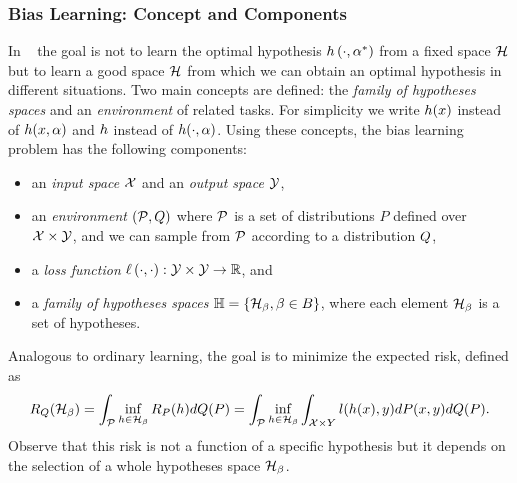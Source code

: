 

\subsubsection*{Bias Learning: Concept and Components}
In ~\cite{baxter2000model} the goal is not to learn the optimal hypothesis $h\left(\cdot, \alpha^*\right)$ from a fixed space $\mathcal{H}$ but to learn a good space $\mathcal{H}$ from which we can obtain an optimal hypothesis in different situations.
%
Two main concepts are defined: the \emph{family of hypotheses spaces} and an \emph{environment} of related tasks. 
For simplicity we write $h(x)$ instead of $h(x, \alpha)$ and $h$ instead of $h(\cdot, \alpha)$.
Using these concepts, the bias learning problem has the following components:
\begin{itemize}
    \item an \emph{input space} $\mathcal{X}$ and an \emph{output space} $\mathcal{Y}$,
    \item an \emph{environment} $(\mathcal{P}, Q)$ where $\mathcal{P}$ is a set of distributions $P$ defined over $\mathcal{X} \times \mathcal{Y}$, and we can sample from $\mathcal{P}$ according to a distribution $Q$,
    \item a \emph{loss function} $\ell\left( \cdot, \cdot\right):\mathcal{Y} \times \mathcal{Y} \to \mathbb{R}$, and
    \item a \emph{family of hypotheses spaces} $\mathbb{H} = \left\{\mathcal{H}_\beta, \beta \in B\right\}$, where each element $\mathcal{H}_\beta$ is a set of hypotheses.
\end{itemize}
Analogous to ordinary learning, the goal is to minimize the expected risk, defined as
\begin{equation}\label{eq:biaslearn_exprisk}
    \bexprisk(\hypspace_\fparam) = \int_{\bprobspace} \inf_{\hypf \in \hypspace_\fparam} \risk_P(\hypf) d\bdistf(P) = \int_{\bprobspace} \inf_{\hypf \in \hypspace_\fparam} \int_{\Xspace \times Y} l(h(x), y) dP(x, y) d\bdistf(P).
\end{equation}
Observe that this risk is not a function of a specific hypothesis but it depends on the selection of a whole hypotheses space $\mathcal{H}_\beta$.
